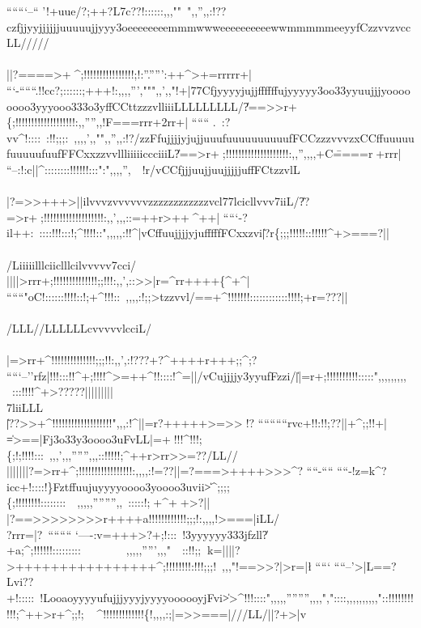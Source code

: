 {{{{{{{{{{   ```````--`` '!+uue/?;++?L7c??!::::::,,,""~",,'',,:!??cz}fjjyyjjjjjjuuuuujjyyy3oeeeeeeeemmmwwweeeeeeeeeewwmmmmmeeyyfC{{zzvvzvccLL////\//\\\\||?====>+^^^^;!!!!!!!!!!!!!!!!;!:''.''''':\jr++^>+=rrrrr+|
     ```-``````.!!cc?;::::::;+++!:,,,,''',""",,',,"!+|77{Cfjyyyyjujjffffffujyyyyy3oo33yyuujjjyoooooooo3yyyooo333o3yffC{}CttzzzvlliiiLLLLLLLLL/\|?==>>r+^^;;!!!!!!!!!!!!!!!!!!!:,,'''',,!F}===rrr+^^rrr+|
      ``````  .~:?vv^!::::~:!!;;;:~,,,,',,"",,'',,:!?/zzFfujjjjyjujjuuufuuuuuuuuuufFCC}zzzvvvzx{CCffuuuuufuuuuufuufFFC}}}xxzzvvllliiiiiccciiiL\|?==>r+^^^;!!!!!!!!!!!!!!!!!!!!:,,'',,,,+C\=====r^^^+rrr|
          ``--:!:c||^::::::::!!!!!!:::":",,,,'',~~!r/vCCfjjjuujjuujjjjjuffFC}tzzvlL\\\\|?=>>+++>||\/ilvvvzvvvvvvzzzzzzzzzzzzvcl77lcicllvvv7iiL/\|??=>r+^^^;!!!!!!!!!!!!!!!!!!!:,,',,,::\ir=++r>++^^^^++|
         `````-?il++:~::::!!!:::!;^!!!!::",,,,,:!!^|vCffuujjjjyjufffffFCxxzvi\||?r^^;;;;!!!!!::!!!!!^+>===?||\\\\/Liiiiilllciiclllcilvvvvv7cci/\\||||>rrr+;!!!!!!!!!!!!!!;;!!!:,,',::>>|r=^rr++++^^;^+^|
        ``````"oC\!!::::::!!!!::!;+^!!!::~,,,,:!;;>\zfjjjujyyyyjuFFF}tzzvvl/\?==+^!!!!!!!::::::::::::!!!!;+r=???||\\\\\//LLL//LLLLLLcvvvvvlcciL/\\\\|=>rr+^!!!!!!!!!!!!!!;;;!!:,,',:!???+?^++++r+++;;^;?
     `````--''rfz|!!!:::!!^+;!!!!^>=++^!!::::!^=||/vCujjjjy3yyufF{zzi/\|||=r+;!!!!!!!!!!:::::",,,,,,,,,~~:::!!!!^+>?????|||||||||\\\Lllvv7liiLLL\\\||??>>+^!!!!!!!!!!!!!!!!!!!",,,:!^||=r?+++++>=>>^^^!?
    ``````````rvc+!!:!!;??||+^;;!!+|\\\|=>==|}Fj3o33y3oooo3uFvLL|=+^^^!!!^!!!;^^;;!;!!!!:::~,,,',,,'''''',,,::!!!!!;^++r>rr>>=??\//LL//\\|||||||?=>rr+^;!!!!!!!!!!!!!!!!!:,,,,:!=??||=?===>++++>>>^?
````-```` ````-!z=^^+^?icc\>+!::::!\}}F}ztffuujuyyyyoooo3yoooo3u}vii\|>^;;;;^^;;!!!!!!!!::::::::~~,,,,,'''''''',,~:::::!;^^^+^+^^^+>?||\\|?==>>>>>>>>r++++^^!!!!!!!!!!!!!;;;!:,,,,!>===|\/iLL/\\?rrr=|?\
````````  `----:v=+++>\lLL?+;!:::~!\uuyufuyyyjjuyyyy3yyyyyy333jf}zll\|?+^^!;^;!!!!!!:::::::::~~~~~~~~,,,,,''''',,,"~~::!!;;^^^^^^^^+=||||?>++++++++++++++++^;!!!!!!!!:!!!;;;!~,,,"!==>>?|\iiiLLL\>>r=|\l
`````   ````--'>|L==?Lvi??+!:::::~!LooaoyyyyufujjjyyyjyyyyoooooyjF}}vi\|>>^!!!::::",,,,,'''''''',,,,","::::,,,,,,,,,,"::!!!!!!!!!!!;^++>r+^;;!;^^^^^^^^^^^^^!!!!!!!!!!!!!^^;!,,,,:;|=>>===|///LL/||?+>|v
